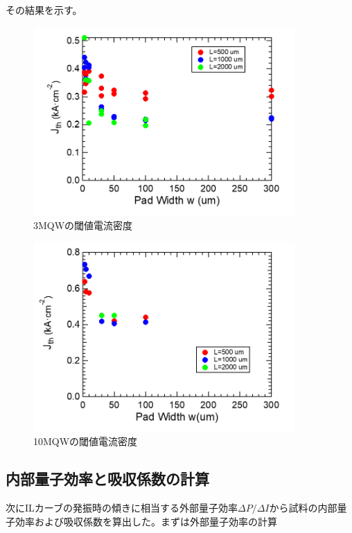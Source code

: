 その結果を示す。
\begin{figure}[h]
	\centering
	\includegraphics[width=10cm]{figure/fig_3_1_3QW_broadcontact_Jth.png}
		\caption{3MQWの閾値電流密度}
		\label{fig:fig_3_1_3QW_broadcontact_Ith}
\end{figure}
\begin{figure}[h]
	\centering
	\includegraphics[width=10cm]{figure/fig_3_1_10QW_broadcontact_Jth.png}
		\caption{10MQWの閾値電流密度}
		\label{fig:fig_3_1_10QW_broadcontact_Ith}
\end{figure}
\newpage
\subsection{内部量子効率と吸収係数の計算}%
次にILカーブの発振時の傾きに相当する外部量子効率$\Delta P/\Delta I$から試料の内部量子効率および吸収係数を算出した。まずは外部量子効率の計算

